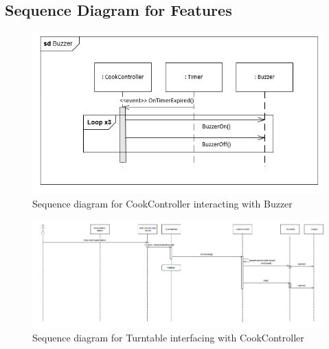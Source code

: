 \subsection{Sequence Diagram for Features}
\begin{figure}[h]
  \centering
  \includegraphics[scale=0.6]{02-Body/Image/BuzzerSEQ.PNG}
  \caption{Sequence diagram for CookController interacting with Buzzer}%
  \label{fig:BuzzerSeq}
\end{figure}

\begin{figure}[h]
  \centering
  \includegraphics[scale=0.6]{02-Body/Image/TurntableSeq.PNG}
  \caption{Sequence diagram for Turntable interfacing with CookController}%
  \label{fig:TurntableSeq}
\end{figure}

\newpage
